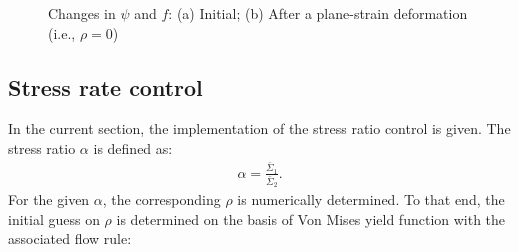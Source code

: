 \documentclass[12pt]{amsart}
\begin{document}
\begin{figure}
\begin{subfigure}[]{}
  \end{subfigure}
  \caption{Changes in $\psi$ and $f$: (a) Initial; (b) After a plane-strain deformation (i.e., $\rho=0$)}
  \label{fig:mk2}
\end{figure}

\subsection{Stress rate control}
\label{sec:imple_alpha}
In the current section, the implementation of the stress ratio control is given.
The stress ratio $\alpha$ is defined as:
\begin{eqnarray}
  \alpha=\frac{\bar{\Sigma}_{1}}{\bar{\Sigma}_{2}}.
\end{eqnarray}
For the given $\alpha$, the corresponding $\rho$ is numerically determined.
To that end, the initial guess on $\rho$ is determined on the basis of Von Mises yield function with the associated flow rule:
\end{document}
